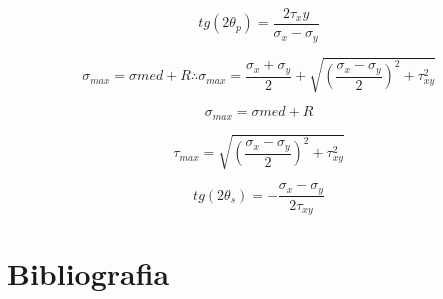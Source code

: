\documentclass[a4paper]{article}
\begin{document}
\begin{equation}
	tg(2\theta_p) = \frac{2\tau_xy}{\sigma_x - \sigma_y}
\end{equation}

\begin{equation}
	\sigma_{max} = \sigma{med} + R \therefore \sigma_{max} = \frac{\sigma_x + \sigma_y}{2} + \sqrt{(\frac{\sigma_x - \sigma_y}{2})^2 + \tau_{xy}^2}
\end{equation}

\begin{equation}
	\sigma_{max} = \sigma{med} + R
\end{equation}

\begin{equation}
	\tau_{max} = \sqrt{(\frac{\sigma_x - \sigma_y}{2})^2 + \tau_{xy}^2}
\end{equation}

\begin{equation}
	tg(2\theta_s) = - \frac{\sigma_x - \sigma_y}{2\tau_{xy}}
\end{equation}


\section{Bibliografia}


\end{document}
